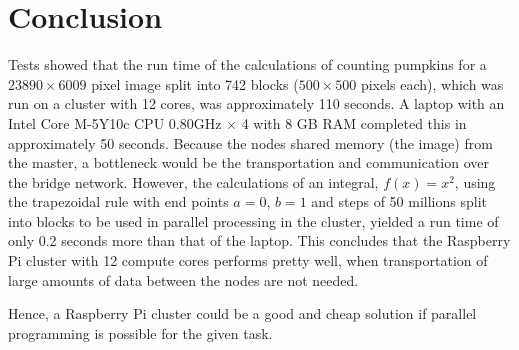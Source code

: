 \documentclass[../Head/Report.tex]{subfiles}
\begin{document}
\section{Conclusion}
Tests showed that the run time of the calculations of counting pumpkins for a $23890 \times 6009$ pixel image split into 742 blocks ($500 \times500$ pixels each), which was run on a cluster with 12 cores, was approximately 110 seconds. A laptop with an Intel Core M-5Y10c CPU 0.80GHz $\times $ 4 with 8 GB RAM completed this in approximately 50 seconds. Because the nodes shared memory (the image) from the master, a bottleneck would be the transportation and communication over the bridge network. However, the calculations of an integral, $f(x) = x^2$, using the trapezoidal rule with end points $a=0$, $b=1$ and steps of 50 millions split into blocks to be used in parallel processing in the cluster, yielded a run time of only 0.2 seconds more than that of the laptop. This concludes that the  Raspberry Pi cluster with 12 compute cores performs pretty well, when transportation of large amounts of data between the nodes are not needed. 

Hence, a Raspberry Pi cluster could be a good and cheap solution if parallel programming is possible for the given task.  
\end{document}
